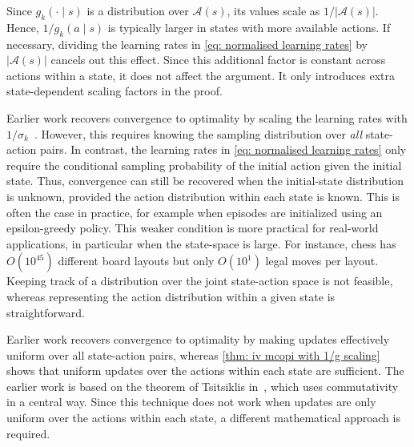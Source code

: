 \documentclass{article}
\begin{document}

Since \(g_k(\cdot \mid s)\) is a distribution over \(\mathcal A(s)\), its values scale as \(1/|\mathcal A(s)|\). Hence, \(1/g_k(a\mid s)\) is typically larger in states with more available actions.
If necessary, dividing the learning rates in \eqref{eq: normalised learning rates} by \(|\mathcal A(s)|\) cancels out this effect.
Since this additional factor is constant across actions within a state, it does not affect the argument. It only introduces extra state-dependent scaling factors in the proof.


Earlier work recovers convergence to optimality by scaling the learning rates with $1/\sigma_k$~\cite{Tsitsiklis2002OnIteration, Liu2021OnStarts}.
However, this requires knowing the sampling distribution over \textit{all} state-action pairs.
In contrast, the learning rates in \eqref{eq: normalised learning rates} 
only require the conditional sampling probability of the
initial action given the initial state.
Thus, convergence can still be recovered when the initial-state distribution is unknown, provided the action distribution within each state is known. This is often the case in practice, for example when episodes are initialized using an epsilon-greedy policy.
% 
This weaker condition is more practical for real-world applications,
in particular when the state-space is large. For instance, chess has
$O(10^{45})$ different board layouts but only $O(10^1)$ legal moves per layout.
Keeping track of a distribution over the joint state-action space is not feasible, whereas representing the action distribution within a given state is straightforward.


Earlier work recovers convergence to optimality by making updates effectively uniform over all state-action pairs, 
whereas \autoref{thm: iv mcopi with 1/g scaling} shows that uniform updates over the actions within each state are sufficient.
The earlier work is based on the theorem of Tsitsiklis in~\cite{Tsitsiklis2002OnIteration}, which uses commutativity in a central way.
Since this technique does not work when updates are only uniform over the actions within each state, a different mathematical approach is required.
\end{document}
